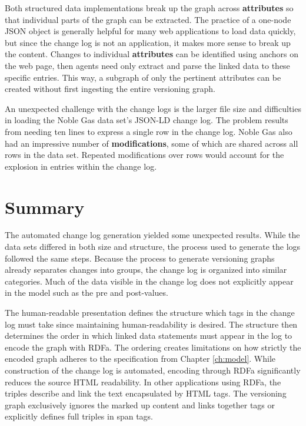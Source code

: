 Both structured data implementations break up the graph across \textbf{attributes} so that individual parts of the graph can be extracted.
The practice of a one-node JSON object is generally helpful for many web applications to load data quickly, but since the change log is not an application, it makes more sense to break up the content.
Changes to individual \textbf{attributes} can be identified using anchors on the web page, then agents need only extract and parse the linked data to these specific entries.
This way, a subgraph of only the pertinent attributes can be created without first ingesting the entire versioning graph.

An unexpected challenge with the change logs is the larger file size and difficulties in loading the Noble Gas data set's JSON-LD change log.
The problem results from needing ten lines to express a single row in the change log.
Noble Gas also had an impressive number of \textbf{modifications}, some of which are shared across all rows in the data set.
Repeated modifications over rows would account for the explosion in entries within the change log.

\section{Summary}

The automated change log generation yielded some unexpected results.
While the data sets differed in both size and structure, the process used to generate the logs followed the same steps.
Because the process to generate versioning graphs already separates changes into groups, the change log is organized into similar categories.
Much of the data visible in the change log does not explicitly appear in the model such as the pre and post-values.

The human-readable presentation defines the structure which tags in the chan\-ge log must take since maintaining human-readability is desired.
The structure then determines the order in which linked data statements must appear in the log to encode the graph with RDFa.
The ordering creates limitations on how strictly the encoded graph adheres to the specification from Chapter \ref{ch:model}.
While construction of the change log is automated, encoding through RDFa significantly reduces the source HTML readability.
In other applications using RDFa, the triples describe and link the text encapsulated by HTML tags.
The versioning graph exclusively ignores the marked up content and links together tags or explicitly defines full triples in span tags.

